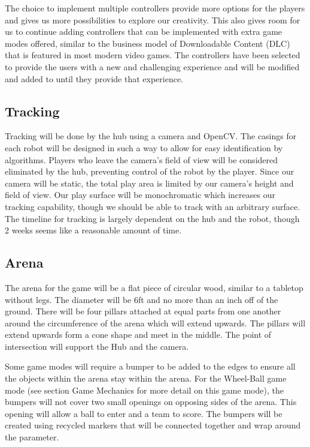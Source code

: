 \documentclass[11pt]{ieeeconf}
\begin{document}
The choice to implement multiple controllers provide more options for the players and gives us more possibilities to explore our creativity. This also gives room for us to continue adding controllers that can be implemented with extra game modes offered, similar to the business model of Downloadable Content (DLC) that is featured in most modern video games. The controllers have been selected to provide the users with a new and challenging experience and will be modified and added to until they provide that experience. 

\subsection{Tracking}

Tracking will be done by the hub using a camera and OpenCV. The casings for each robot will be designed in such a way to allow for easy identification by algorithms. Players who leave the camera's field of view will be considered eliminated by the hub, preventing control of the robot by the player. Since our camera will be static, the total play area is limited by our camera's height and field of view. Our play surface will be monochromatic which increases our tracking capability, though we should be able to track with an arbitrary surface. The timeline for tracking is largely dependent on the hub and the robot, though 2 weeks seems like a reasonable amount of time.

\subsection{Arena}

The arena for the game will be a flat piece of circular wood, similar to a tabletop without legs. The diameter will be 6ft and no more than an inch off of the ground. There will be four pillars attached at equal parts from one another around the circumference of the arena which will extend upwards. The pillars will extend upwards form a cone shape and meet in the middle. The point of intersection will support the Hub and the camera. 

Some game modes will require a bumper to be added to the edges to ensure all the objects within the arena stay within the arena. For the Wheel-Ball game mode (see section Game Mechanics for more detail on this game mode), the bumpers will not cover two small openings on opposing sides of the arena. This opening will allow a ball to enter and a team to score. The bumpers will be created using recycled markers that will be connected together and wrap around the parameter. 
\end{document}
